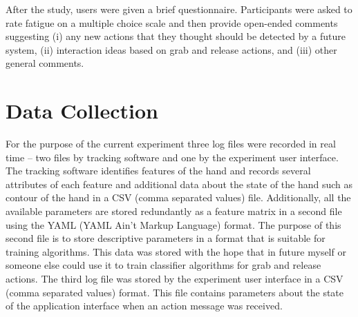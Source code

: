 After the study, users were given a brief questionnaire.  
Participants were asked to rate fatigue on a multiple choice scale and then provide open-ended comments suggesting (i) any new actions that they thought should be detected by a future system, (ii) interaction ideas based on grab and release actions, and (iii) other general comments.

\section{Data Collection}
For the purpose of the current experiment three log files were recorded in real
time -- two files by tracking software and one by the experiment user interface.
The tracking software identifies features of the hand and records several
attributes of each feature and additional data about the state of the hand such
as contour of the hand in a CSV (comma separated values) file.
Additionally, all the available parameters are stored redundantly as a feature matrix in a second file using the YAML (YAML Ain't Markup Language) format.
The purpose of this second file is to store descriptive parameters in a format that is suitable for training algorithms.
This data was stored with the hope that in future myself or someone else could use it to train classifier algorithms for grab and release actions.
The third log file was stored by the experiment user interface in a CSV (comma separated values) format.
This file contains parameters about the state of the application interface when an action message was received.

